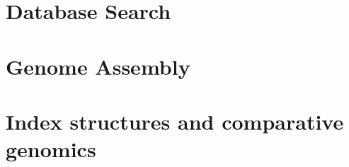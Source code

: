 

    \chapter{Database Search}
    

    \chapter{Genome Assembly}




    \chapter{Index structures and comparative genomics}





